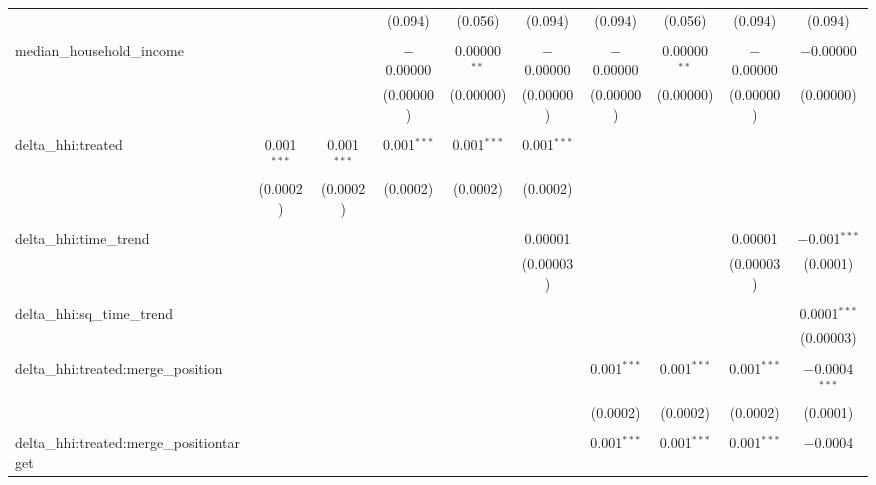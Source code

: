 \begin{table}[H]
{\begin{tabular}{@{\extracolsep{5pt}}lccccccccc}
   &  &  & (0.094) & (0.056) & (0.094) & (0.094) & (0.056) & (0.094) & (0.094) \\  

   & & & & & & & & & \\  

  median\_household\_income &  &  & $-$0.00000 & 0.00000$^{**}$ & $-$0.00000 & $-$0.00000 & 0.00000$^{**}$ & $-$0.00000 & $-$0.00000 \\  

   &  &  & (0.00000) & (0.00000) & (0.00000) & (0.00000) & (0.00000) & (0.00000) & (0.00000) \\  

   & & & & & & & & & \\  

  delta\_hhi:treated & 0.001$^{***}$ & 0.001$^{***}$ & 0.001$^{***}$ & 0.001$^{***}$ & 0.001$^{***}$ &  &  &  &  \\  

   & (0.0002) & (0.0002) & (0.0002) & (0.0002) & (0.0002) &  &  &  &  \\  

   & & & & & & & & & \\  

  delta\_hhi:time\_trend &  &  &  &  & 0.00001 &  &  & 0.00001 & $-$0.001$^{***}$ \\  

   &  &  &  &  & (0.00003) &  &  & (0.00003) & (0.0001) \\  

   & & & & & & & & & \\  

  delta\_hhi:sq\_time\_trend &  &  &  &  &  &  &  &  & 0.0001$^{***}$ \\  

   &  &  &  &  &  &  &  &  & (0.00003) \\  

   & & & & & & & & & \\  

  delta\_hhi:treated:merge\_position &  &  &  &  &  & 0.001$^{***}$ & 0.001$^{***}$ & 0.001$^{***}$ & $-$0.0004$^{***}$ \\  

   &  &  &  &  &  & (0.0002) & (0.0002) & (0.0002) & (0.0001) \\  

   & & & & & & & & & \\  

  delta\_hhi:treated:merge\_positiontarget &  &  &  &  &  & 0.001$^{***}$ & 0.001$^{***}$ & 0.001$^{***}$ & $-$0.0004 \\  


\end{tabular}}
\end{table}
